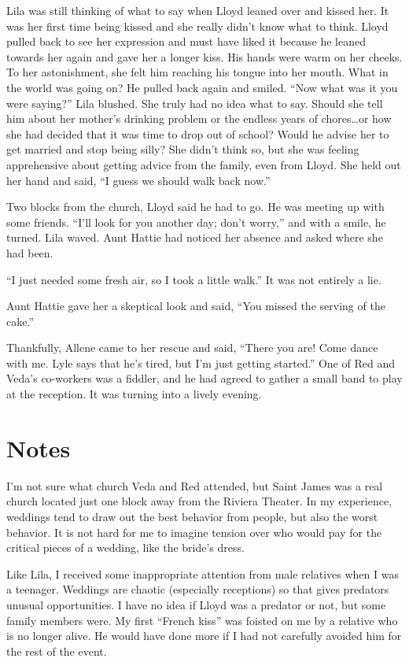 \documentclass[
  letterpaper,
]{book}
\begin{document}
Lila was still thinking of what to say when Lloyd leaned over and kissed
her. It was her first time being kissed and she really didn't know what
to think. Lloyd pulled back to see her expression and must have liked it
because he leaned towards her again and gave her a longer kiss. His
hands were warm on her cheeks. To her astonishment, she felt him
reaching his tongue into her mouth. What in the world was going on? He
pulled back again and smiled. ``Now what was it you were saying?'' Lila
blushed. She truly had no idea what to say. Should she tell him about
her mother's drinking problem or the endless years of chores\ldots or
how she had decided that it was time to drop out of school? Would he
advise her to get married and stop being silly? She didn't think so, but
she was feeling apprehensive about getting advice from the family, even
from Lloyd. She held out her hand and said, ``I guess we should walk
back now.''

Two blocks from the church, Lloyd said he had to go. He was meeting up
with some friends. ``I'll look for you another day; don't worry,'' and
with a smile, he turned. Lila waved. Aunt Hattie had noticed her absence
and asked where she had been.

``I just needed some fresh air, so I took a little walk.'' It was not
entirely a lie.

Aunt Hattie gave her a skeptical look and said, ``You missed the serving
of the cake.''

Thankfully, Allene came to her rescue and said, ``There you are! Come
dance with me. Lyle says that he's tired, but I'm just getting
started.'' One of Red and Veda's co-workers was a fiddler, and he had
agreed to gather a small band to play at the reception. It was turning
into a lively evening.

\section{Notes}\label{notes-23}

I'm not sure what church Veda and Red attended, but Saint James was a
real church located just one block away from the Riviera Theater. In my
experience, weddings tend to draw out the best behavior from people, but
also the worst behavior. It is not hard for me to imagine tension over
who would pay for the critical pieces of a wedding, like the bride's
dress.

Like Lila, I received some inappropriate attention from male relatives
when I was a teenager. Weddings are chaotic (especially receptions) so
that gives predators unusual opportunities. I have no idea if Lloyd was
a predator or not, but some family members were. My first ``French
kiss'' was foisted on me by a relative who is no longer alive. He would
have done more if I had not carefully avoided him for the rest of the
event.
\end{document}
